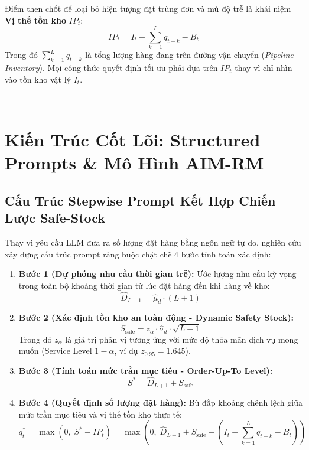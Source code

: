 \documentclass[11pt,a4paper]{article}
\begin{document}
\begin{formulationbox}
Điểm then chốt để loại bỏ hiện tượng đặt trùng đơn và mù độ trễ là khái niệm \textbf{Vị thế tồn kho} $IP_t$:
\begin{equation}
    IP_t = I_t + \sum_{k=1}^{L} q_{t-k} - B_t
\end{equation}
Trong đó $\sum_{k=1}^{L} q_{t-k}$ là tổng lượng hàng đang trên đường vận chuyển (\textit{Pipeline Inventory}). Mọi công thức quyết định tối ưu phải dựa trên $IP_t$ thay vì chỉ nhìn vào tồn kho vật lý $I_t$.
\end{formulationbox}

---

\section{Kiến Trúc Cốt Lõi: Structured Prompts \& Mô Hình AIM-RM}

\subsection{Cấu Trúc Stepwise Prompt Kết Hợp Chiến Lược Safe-Stock}

Thay vì yêu cầu LLM đưa ra số lượng đặt hàng bằng ngôn ngữ tự do, nghiên cứu xây dựng cấu trúc prompt ràng buộc chặt chẽ 4 bước tính toán xác định:

\begin{enumerate}[leftmargin=1.8em]
    \item \textbf{Bước 1 (Dự phóng nhu cầu thời gian trễ):} Ước lượng nhu cầu kỳ vọng trong toàn bộ khoảng thời gian từ lúc đặt hàng đến khi hàng về kho:
    \begin{equation}
        \hat{D}_{L+1} = \hat{\mu}_d \cdot (L + 1)
    \end{equation}
    \item \textbf{Bước 2 (Xác định tồn kho an toàn động - Dynamic Safety Stock):} 
    \begin{equation}
        S_{\text{safe}} = z_{\alpha} \cdot \hat{\sigma}_d \cdot \sqrt{L + 1}
    \end{equation}
    Trong đó $z_{\alpha}$ là giá trị phân vị tương ứng với mức độ thỏa mãn dịch vụ mong muốn (Service Level $1 - \alpha$, ví dụ $z_{0.95} = 1.645$).
    \item \textbf{Bước 3 (Tính toán mức trần mục tiêu - Order-Up-To Level):}
    \begin{equation}
        S^* = \hat{D}_{L+1} + S_{\text{safe}}
    \end{equation}
    \item \textbf{Bước 4 (Quyết định số lượng đặt hàng):} Bù đắp khoảng chênh lệch giữa mức trần mục tiêu và vị thế tồn kho thực tế:
    \begin{equation}
        q_t^* = \max\left(0, \; S^* - IP_t\right) = \max\left(0, \; \hat{D}_{L+1} + S_{\text{safe}} - \left(I_t + \sum_{k=1}^L q_{t-k} - B_t\right)\right)
    \end{equation}
\end{enumerate}
\end{document}
